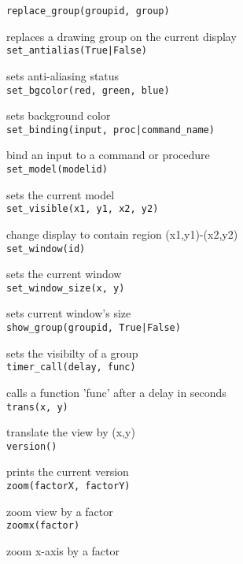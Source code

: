{\tt replace\_group(groupid, group) }

replaces a drawing group on the current display \\


{\tt set\_antialias(True|False) }

sets anti-aliasing status \\


{\tt set\_bgcolor(red, green, blue) }

sets background color \\


{\tt set\_binding(input, proc|command\_name) }

bind an input to a command or procedure \\


{\tt set\_model(modelid) }

sets the current model \\


{\tt set\_visible(x1, y1, x2, y2) }

change display to contain region (x1,y1)-(x2,y2) \\


{\tt set\_window(id) }

sets the current window \\


{\tt set\_window\_size(x, y) }

sets current window's size \\


{\tt show\_group(groupid, True|False) }

sets the visibilty of a group \\


{\tt timer\_call(delay, func) }

calls a function 'func' after a delay in seconds \\


{\tt trans(x, y) }

translate the view by (x,y) \\


{\tt version() }

prints the current version \\


{\tt zoom(factorX, factorY) }

zoom view by a factor \\


{\tt zoomx(factor) }

zoom x-axis by a factor \\


